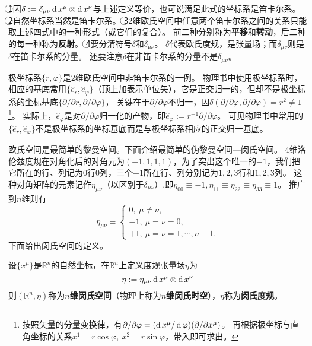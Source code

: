 \begin{note}
\textcircled{1}因$\delta := \delta_{\mu\nu}\operatorname{d} x^\mu\otimes\operatorname{d} x^\nu$与上述定义等价，也可说满足此式的坐标系是笛卡尔系。
\textcircled{2}自然坐标系当然是笛卡尔系。
\textcircled{3}$2$维欧氏空间中任意两个笛卡尔系之间的关系只能取上述四式中的一种形式（或它们的复合）。
前二种分别称为\textbf{平移}和\textbf{转动}，后二种的每一种称为\textbf{反射}。
\textcircled{4}要分清符号$\delta$和$\delta_{\mu\nu}$。
$\delta$代表欧氏度规，是张量场；而$\delta_{\mu\nu}$则是$\delta$在笛卡尔系的分量。
还要注意$\delta$在非笛卡尔系的分量不是$\delta_{\mu\nu}$。
\end{note}

极坐标系$\{r, \varphi\}$是$2$维欧氏空间中非笛卡尔系的一例。
物理书中使用极坐标系时，相应的基底常用$\{\hat{e}_r, \hat{e}_\varphi\}$（顶上加$\hat{}$表示单位矢），它是正交归一的，但却不是极坐标系的坐标基底$\{\partial / \partial r, \partial / \partial\varphi\}$，
关键在于$\partial / \partial\varphi$不归一，因$\delta(\partial / \partial\varphi, \partial / \partial\varphi) = r^2 \neq 1$\footnote{
按照矢量的分量变换律，有$\partial / \partial\varphi = (\operatorname{d} x^\mu / \operatorname{d}\varphi)(\partial / \partial x^\mu)$。
再根据极坐标与直角坐标的关系$x^1 = r\cos\varphi, ~ x^2 = r\sin\varphi$，带入即可求出。
}。
实际上，$\hat{e}_\varphi$是对$\partial / \partial\varphi$归一化的产物，即$\hat{e}_\varphi := r^{-1}\partial / \partial\varphi$。
可见物理书中常用的$\{\hat{e}_r, \hat{e}_\varphi\}$不是极坐标系的坐标基底而是与极坐标系相应的正交归一基底。

欧氏空间是最简单的黎曼空间。下面介绍最简单的伪黎曼空间---闵氏空间。
$4$维洛伦兹度规在对角化后的对角元为$(-1, 1, 1, 1)$，为了突出这个唯一的$-1$，我们把它所在的行、列记为$0$行$0$列，三个$+1$所在行、列分别记为$1, 2, 3$行和$1, 2, 3$列。
这种对角矩阵的元素记作$\eta_{\mu\nu}$（以区别于$\delta_{\mu\nu}$）,即$\eta_{00} \equiv -1, \eta_{11} \equiv \eta_{22} \equiv \eta_{33} \equiv 1$。
推广到$n$维则有
$$
\eta_{\mu\nu} \equiv
\begin{cases}
0, ~ \mu \neq \nu, \\
-1, ~ \mu = \nu = 0, \\
+1, ~ \mu = \nu = 1, \cdots, n -1.
\end{cases}
$$
下面给出闵氏空间的定义。

\begin{definition}
设$\{x^\mu\}$是$\mathbb{R}^n$的自然坐标，在$\mathbb{R}^n$上定义度规张量场$\eta$为
$$\eta := \eta_{\mu\nu}\operatorname{d} x^\mu\otimes\operatorname{d} x^\nu$$
则$(\mathbb{R}^n, \eta)$称为\textbf{$n$维闵氏空间}（物理上称为\textbf{$n$维闵氏时空}），$\eta$称为\textbf{闵氏度规}。
\end{definition}

